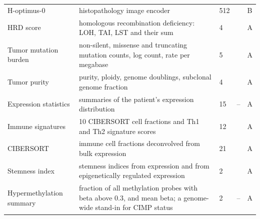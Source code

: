 \begin{longtable}{P{3.0cm}P{5.0cm}P{1.5cm}P{1.5cm}P{1.4cm}}
H-optimus-0 & histopathology image encoder & 512 & \citep{Saillard2024} & B \\
HRD score & homologous recombination deficiency: LOH, TAI, LST and their sum & 4 & \citep{Knijnenburg2018} & A \\
Tumor mutation burden & non-silent, missense and truncating mutation counts, log count, rate per megabase & 5 & \citep{Ellrott2018} & A \\
Tumor purity & purity, ploidy, genome doublings, subclonal genome fraction & 4 & \citep{Carter2012} & A \\
Expression statistics & summaries of the patient's expression distribution & 15 & -- & A \\
Immune signatures & 10 CIBERSORT cell fractions and Th1 and Th2 signature scores & 12 & \citep{Thorsson2018} & A \\
CIBERSORT & immune cell fractions deconvolved from bulk expression & 21 & \citep{Newman2015, Thorsson2018} & A \\
Stemness index & stemness indices from expression and from epigenetically regulated expression & 2 & \citep{Malta2018} & A \\
Hypermethylation summary & fraction of all methylation probes with beta above 0.3, and mean beta; a genome-wide stand-in for CIMP status \citep{Toyota1999} & 2 & -- & A \\
\end{longtable}

